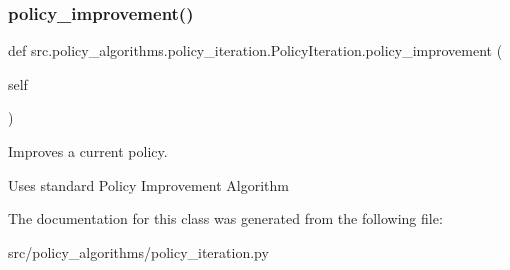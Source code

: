 \subsubsection{\texorpdfstring{policy\+\_\+improvement()}{policy\_improvement()}}
{\footnotesize\ttfamily def src.\+policy\+\_\+algorithms.\+policy\+\_\+iteration.\+Policy\+Iteration.\+policy\+\_\+improvement (\begin{DoxyParamCaption}\item[{}]{self }\end{DoxyParamCaption})}



Improves a current policy. 

Uses standard Policy Improvement Algorithm 

The documentation for this class was generated from the following file\+:\begin{DoxyCompactItemize}
\item 
src/policy\+\_\+algorithms/policy\+\_\+iteration.\+py\end{DoxyCompactItemize}
